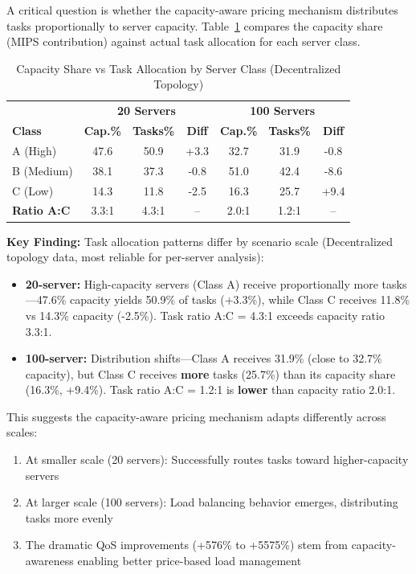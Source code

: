 \documentclass[conference]{IEEEtran}
\begin{document}
A critical question is whether the capacity-aware pricing mechanism distributes tasks proportionally to server capacity. Table~\ref{tab:class_workload} compares the capacity share (MIPS contribution) against actual task allocation for each server class.

\begin{table}[H]
\centering
\caption{Capacity Share vs Task Allocation by Server Class (Decentralized Topology)}
\label{tab:class_workload}
\footnotesize
\setlength{\tabcolsep}{2.5pt}
\begin{tabular}{@{}l|ccc|ccc@{}}
\toprule
 & \multicolumn{3}{c|}{\textbf{20 Servers}} & \multicolumn{3}{c}{\textbf{100 Servers}} \\
\textbf{Class} & \textbf{Cap.\%} & \textbf{Tasks\%} & \textbf{Diff} & \textbf{Cap.\%} & \textbf{Tasks\%} & \textbf{Diff} \\
\midrule
A (High) & 47.6 & 50.9 & +3.3 & 32.7 & 31.9 & -0.8 \\
B (Medium) & 38.1 & 37.3 & -0.8 & 51.0 & 42.4 & -8.6 \\
C (Low) & 14.3 & 11.8 & -2.5 & 16.3 & 25.7 & +9.4 \\
\midrule
\textbf{Ratio A:C} & 3.3:1 & 4.3:1 & -- & 2.0:1 & 1.2:1 & -- \\
\bottomrule
\end{tabular}
\end{table}

\textbf{Key Finding:} Task allocation patterns differ by scenario scale (Decentralized topology data, most reliable for per-server analysis):
\begin{itemize}
    \item \textbf{20-server:} High-capacity servers (Class A) receive proportionally more tasks---47.6\% capacity yields 50.9\% of tasks (+3.3\%), while Class C receives 11.8\% vs 14.3\% capacity (-2.5\%). Task ratio A:C = 4.3:1 exceeds capacity ratio 3.3:1.
    \item \textbf{100-server:} Distribution shifts---Class A receives 31.9\% (close to 32.7\% capacity), but Class C receives \textbf{more} tasks (25.7\%) than its capacity share (16.3\%, +9.4\%). Task ratio A:C = 1.2:1 is \textbf{lower} than capacity ratio 2.0:1.
\end{itemize}

This suggests the capacity-aware pricing mechanism adapts differently across scales:
\begin{enumerate}
    \item At smaller scale (20 servers): Successfully routes tasks toward higher-capacity servers
    \item At larger scale (100 servers): Load balancing behavior emerges, distributing tasks more evenly
    \item The dramatic QoS improvements (+576\% to +5575\%) stem from capacity-awareness enabling better price-based load management
\end{enumerate}
\end{document}
